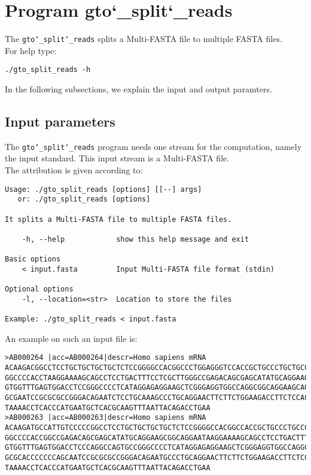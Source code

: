 \section{Program gto\char`_split\char`_reads}
The \texttt{gto\char`_split\char`_reads} splits a Multi-FASTA file to multiple FASTA files.\\
For help type:
\begin{lstlisting}
./gto_split_reads -h
\end{lstlisting}
In the following subsections, we explain the input and output paramters.

\subsection*{Input parameters}

The \texttt{gto\char`_split\char`_reads} program needs one stream for the computation,
namely the input standard. This input stream is a Multi-FASTA file.\\
The attribution is given according to:
\begin{lstlisting}
Usage: ./gto_split_reads [options] [[--] args]
   or: ./gto_split_reads [options]

It splits a Multi-FASTA file to multiple FASTA files.

    -h, --help            show this help message and exit

Basic options
    < input.fasta         Input Multi-FASTA file format (stdin)

Optional options
    -l, --location=<str>  Location to store the files

Example: ./gto_split_reads < input.fasta
\end{lstlisting}
An example on such an input file is:
\begin{lstlisting}
>AB000264 |acc=AB000264|descr=Homo sapiens mRNA 
ACAAGACGGCCTCCTGCTGCTGCTGCTCTCCGGGGCCACGGCCCTGGAGGGTCCACCGCTGCCCTGCTGCCATTGTCCCC
GGCCCCACCTAAGGAAAAGCAGCCTCCTGACTTTCCTCGCTTGGGCCGAGACAGCGAGCATATGCAGGAAGCGGCAGGAA
GTGGTTTGAGTGGACCTCCGGGCCCCTCATAGGAGAGGAAGCTCGGGAGGTGGCCAGGCGGCAGGAAGCAGGCCAGTGCC
GCGAATCCGCGCGCCGGGACAGAATCTCCTGCAAAGCCCTGCAGGAACTTCTTCTGGAAGACCTTCTCCACCCCCCCAGC
TAAAACCTCACCCATGAATGCTCACGCAAGTTTAATTACAGACCTGAA
>AB000263 |acc=AB000263|descr=Homo sapiens mRNA 
ACAAGATGCCATTGTCCCCCGGCCTCCTGCTGCTGCTGCTCTCCGGGGCCACGGCCACCGCTGCCCTGCCCCTGGAGGGT
GGCCCCACCGGCCGAGACAGCGAGCATATGCAGGAAGCGGCAGGAATAAGGAAAAGCAGCCTCCTGACTTTCCTCGCTTG
GTGGTTTGAGTGGACCTCCCAGGCCAGTGCCGGGCCCCTCATAGGAGAGGAAGCTCGGGAGGTGGCCAGGCGGCAGGAAG
GCGCACCCCCCCAGCAATCCGCGCGCCGGGACAGAATGCCCTGCAGGAACTTCTTCTGGAAGACCTTCTCCTCCTGCAAA
TAAAACCTCACCCATGAATGCTCACGCAAGTTTAATTACAGACCTGAA
\end{lstlisting}

